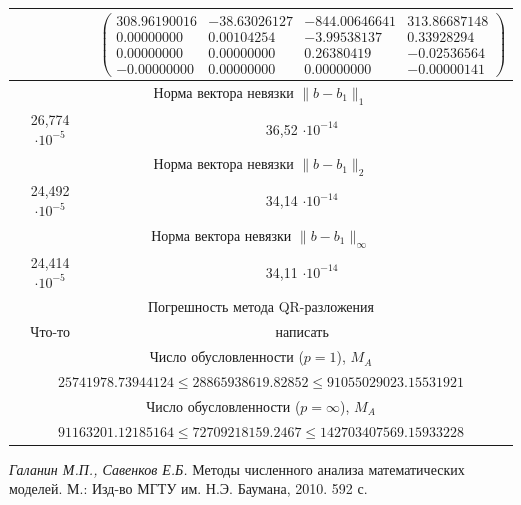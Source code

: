\documentclass[12pt, a4paper]{article}
\begin{document}
\begin{center}
\begin{tabular}{|c|c|}
{		} & 
		\tiny{
			$
			\begin{pmatrix}
				308.96190016 & -38.63026127 & -844.00646641 & 313.86687148 \\ 
				0.00000000 &  0.00104254 & -3.99538137 & 0.33928294 \\ 
				0.00000000 & 0.00000000 &  0.26380419 & -0.02536564 \\ 
				-0.00000000 & 0.00000000 & 0.00000000 & -0.00000141 
			\end{pmatrix}
			$
			
		}\\
		\hline \multicolumn{2}{|c|}{Норма вектора невязки $\|b - b_1 \|_1$}\\
		\hline
		26,774 $\cdot 10^{-5}$ & 36,52 $\cdot 10^{-14}$\\
		\hline \multicolumn{2}{|c|}{Норма вектора невязки $\|b - b_1 \|_2$}\\
		\hline
		24,492 $\cdot 10^{-5}$ & 34,14 $\cdot 10^{-14}$\\
		\hline \multicolumn{2}{|c|}{Норма вектора невязки $\|b - b_1 \|_{\infty}$}\\
		\hline
		24,414 $\cdot 10^{-5}$ & 34,11 $\cdot 10^{-14}$\\
		\hline  \multicolumn{2}{|c|}{Погрешность метода QR-разложения}\\
		\hline
		Что-то & написать \\
		\hline 
		\multicolumn{2}{|c|}{ Число обусловленности ($p = 1 $), $M_A$}\\
		\hline
		\multicolumn{2}{|c|}{$25741978.73944124 \leqslant 28865938619.82852 \leqslant 	91055029023.15531921$}\\
		\hline \multicolumn{2}{|c|}{Число обусловленности ($p = \infty $), $M_A$}\\
		\hline \multicolumn{2}{|c|}{$91163201.12185164 \leqslant 72709218159.2467\leqslant 142703407569.15933228$}\\
		\hline
		
		
	\end{tabular}
\end{center}







\newpage
\begin{thebibliography}{1}
	 \textit{Галанин М.П., Савенков Е.Б.} Методы численного анализа математических\\ моделей. М.: Изд-во МГТУ им. Н.Э. Баумана,	2010. 592 с.
	
	
\end{thebibliography}
\end{document}
